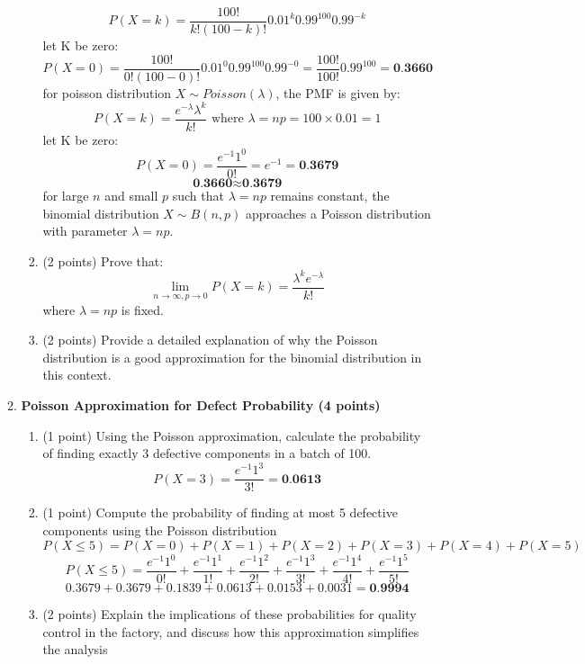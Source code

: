 \documentclass[a3paper,12pt]{article} %
\begin{document}
\begin{enumerate}
\begin{enumerate}
\begin{enumerate}
\[            \]
            \[
                P(X = k) = \frac{100!}{k!(100 - k)!} 0.01^k 0.99^{100} 0.99^{-k}
            \]
            let K be zero:
            \[
                P(X = 0) = \frac{100!}{0!(100 - 0)!} 0.01^0 0.99^{100} 0.99^{-0} = \frac{100!}{100!} 0.99^{100} = \textbf{0.3660}
            \]
            for poisson distribution  \( X \sim Poisson(\lambda) \), the PMF is given by:
            \[
                P(X = k) = \frac{e^{-\lambda} \lambda^k}{k!} \text{ where } \lambda = np = 100 \times 0.01 = 1
            \]
            let K be zero:
            \[
                P(X = 0) = \frac{e^{-1} 1^0}{0!} = e^{-1} = \textbf{0.3679}
            \]
            \[
                \textbf{0.3660} \approx \textbf{0.3679}
            \]
            for large \( n \) and small \( p \) such that \( \lambda = np \) remains constant, the binomial distribution \( X \sim B(n, p) \) approaches a Poisson distribution with parameter \( \lambda = np \).
            \item (2 points) Prove that:
            \[
                \lim_{n \to \infty, p \to 0} P(X = k) = \frac{\lambda^k e^{-\lambda}}{k!}
            \]
            where \(\lambda = np\) is fixed.
            \item (2 points) Provide a detailed explanation of why the Poisson distribution is a good approximation for the binomial distribution in this context.
        \end{enumerate}  
        \item \textbf{Poisson Approximation for Defect Probability (4 points)}
        \begin{enumerate}
            \item (1 point) Using the Poisson approximation, calculate the probability of finding exactly 3 defective components in a batch of 100.
            \[
                P(X = 3) = \frac{e^{-1} 1^3}{3!} = \textbf{0.0613}
            \]
            \item (1 point) Compute the probability of finding at most 5 defective components using the Poisson distribution
            \[
                P(X \leq 5) = P(X = 0) + P(X = 1) + P(X = 2) + P(X = 3) + P(X = 4) + P(X = 5) 
            \]
            \[
                P(X \leq 5) = \frac{e^{-1} 1^0}{0!} + \frac{e^{-1} 1^1}{1!} + \frac{e^{-1} 1^2}{2!} + \frac{e^{-1} 1^3}{3!} + \frac{e^{-1} 1^4}{4!} + \frac{e^{-1} 1^5}{5!}
            \]
            \[
                0.3679 + 0.3679 + 0.1839 + 0.0613 + 0.0153 + 0.0031 = \textbf{0.9994}
            \]
            \item (2 points) Explain the implications of these probabilities for quality control in the factory, and discuss how this approximation simplifies the analysis

\end{enumerate}
\end{enumerate}
\end{enumerate}
\end{document}
